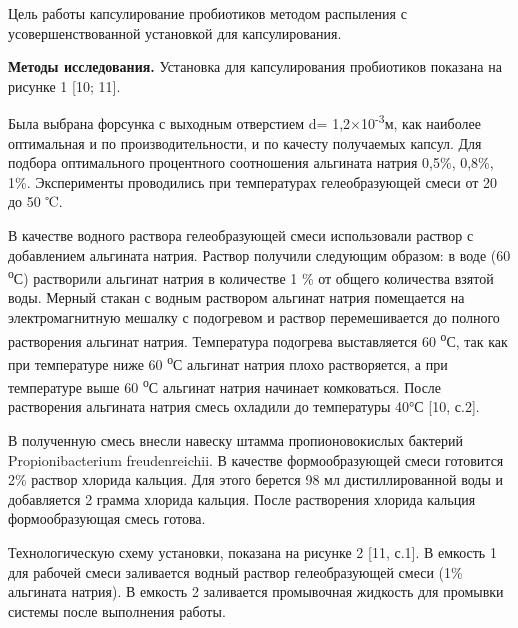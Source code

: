 \begin{multicols}{2}
Цель работы капсулирование пробиотиков методом распыления с
усовершенствованной установкой для капсулирования.

{\bfseries Методы исследования.} Установка для капсулирования пробиотиков
показана на рисунке 1 {[}10; 11{]}.	

Была выбрана форсунка с выходным отверстием d=
1,2×10\textsuperscript{-3}м, как наиболее оптимальная и по
производительности, и по качесту получаемых капсул. Для подбора
оптимального процентного соотношения альгината натрия 0,5\%, 0,8\%, 1\%.
Эксперименты проводились при температурах гелеобразующей смеси от 20 до
50 ℃.

В качестве водного раствора гелеобразующей смеси использовали раствор с
добавлением альгината натрия. Раствор получили следующим образом: в воде
(60 \textsuperscript{о}С) растворили альгинат натрия в количестве 1 \%
от общего количества взятой воды. Мерный стакан с водным раствором
альгинат натрия помещается на электромагнитную мешалку с подогревом и
раствор перемешивается до полного растворения альгинат натрия.
Температура подогрева выставляется 60 \textsuperscript{о}С, так как при
температуре ниже 60 \textsuperscript{о}С альгинат натрия плохо
растворяется, а при температуре выше 60 \textsuperscript{о}С альгинат
натрия начинает комковаться. После растворения альгината натрия смесь
охладили до температуры 40°С {[}10, с.2{]}.

В полученную смесь внесли навеску штамма пропионовокислых бактерий
Propionibacterium freudenreichii. В качестве формообразующей смеси
готовится 2\% раствор хлорида кальция. Для этого берется 98 мл
дистиллированной воды и добавляется 2 грамма хлорида кальция. После
растворения хлорида кальция формообразующая смесь готова.

Технологическую схему установки, показана на рисунке 2 {[}11, с.1{]}. В
емкость 1 для рабочей смеси заливается водный раствор гелеобразующей
смеси (1\% альгината натрия). В емкость 2 заливается промывочная
жидкость для промывки системы после выполнения работы.
\end{multicols}

